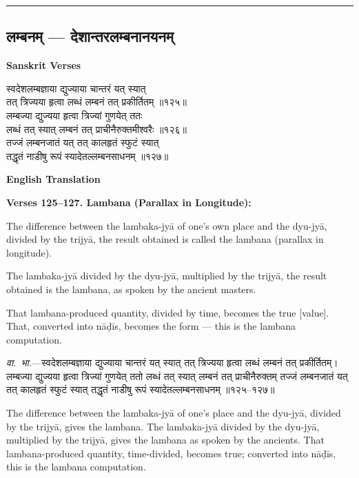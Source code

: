 \documentclass[11pt,a4paper]{article}
\newcommand{\longline}{\noindent\rule{\textwidth}{0.4pt}}
\newcommand{\dev}[1]{{\devanagarifont #1}}
\newcommand{\sectsep}{\par\vspace{0.8em}\longline\vspace{0.8em}}
\begin{document}
\sectsep

\subsection{\dev{लम्बनम् --- देशान्तरलम्बनानयनम्}}

\begin{minipage}[t]{0.48\textwidth}
\textbf{\small Sanskrit Verses}

\small\devanagarifont
स्वदेशलम्बज्ञाया द्युज्याया चान्तरं यत् स्यात्\\
तत् त्रिज्यया हृत्वा लब्धं लम्बनं तत् प्रकीर्तितम् ॥१२५॥\\[0.5em]
लम्बज्या द्युज्यया हृत्वा त्रिज्यां गुणयेत् ततः\\
लब्धं तत् स्यात् लम्बनं तत् प्राचीनैरुक्तमीश्वरैः ॥१२६॥\\[0.5em]
तज्जं लम्बनजातं यत् तत् कालहृतं स्फुटं स्यात्\\
तद्धृतं नाडीषु रूपं स्यादेतल्लम्बनसाधनम् ॥१२७॥
\end{minipage}%
\hfill
\begin{minipage}[t]{0.48\textwidth}
\textbf{\small English Translation}

\textbf{Verses 125--127. Lambana (Parallax in Longitude):}

The difference between the lambaka-jy\=a of one's own place and the dyu-jy\=a, divided by the trijy\=a, the result obtained is called the lambana (parallax in longitude).

The lambaka-jy\=a divided by the dyu-jy\=a, multiplied by the trijy\=a, the result obtained is the lambana, as spoken by the ancient masters.

That lambana-produced quantity, divided by time, becomes the true [value]. That, converted into n\=a\d{d}\=is, becomes the form --- this is the lambana computation.
\end{minipage}

\vspace{0.5em}
\begin{minipage}[t]{0.48\textwidth}
\small\devanagarifont
\textit{वा.~भा.}---स्वदेशलम्बज्ञाया द्युज्याया चान्तरं यत् स्यात् तत् त्रिज्यया हृत्वा लब्धं लम्बनं तत् प्रकीर्तितम्। लम्बज्या द्युज्यया हृत्वा त्रिज्यां गुणयेत् ततो लब्धं तत् स्यात् लम्बनं तत् प्राचीनैरुक्तम् तज्जं लम्बनजातं यत् तत् कालहृतं स्फुटं स्यात् तद्धृतं नाडीषु रूपं स्यादेतल्लम्बनसाधनम् ॥१२५--१२७॥
\end{minipage}%
\hfill
\begin{minipage}[t]{0.48\textwidth}
\small
The difference between the lambaka-jy\=a of one's place and the dyu-jy\=a, divided by the trijy\=a, gives the lambana. The lambaka-jy\=a divided by the dyu-jy\=a, multiplied by the trijy\=a, gives the lambana as spoken by the ancients. That lambana-produced quantity, time-divided, becomes true; converted into n\=a\d{d}\=is, this is the lambana computation.
\end{minipage}
\end{document}
